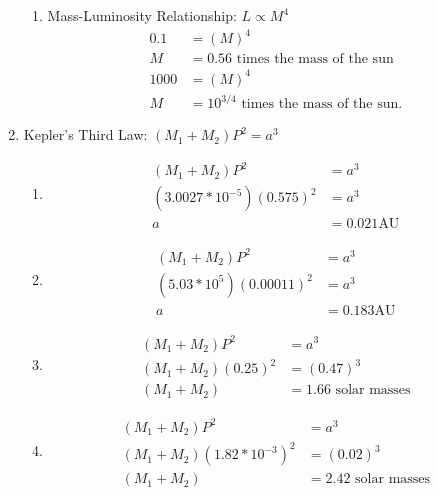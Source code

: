 \documentclass{article}
\begin{document}
\begin{enumerate}
\begin{enumerate}
        \item
        
        Mass-Luminosity Relationship: $L\propto M^4$
        \begin{align*}
            0.1 &= (M)^4\\
            M &= 0.56 \text{ times the mass of the sun}\\
            1000 &= (M)^4\\
            M &= 10^{3/4}\text{ times the mass of the sun}.
        \end{align*}
        
    \end{enumerate}
    
    \item
    
    Kepler's Third Law: $(M_1+M_2)P^2 = a^3$
    \begin{enumerate}
        \item 
        
        \begin{align*}
            (M_1+M_2)P^2 &= a^3\\
            (3.0027*10^{-5})(0.575)^2 &= a^3\\
            a &= 0.021 \text{AU}
        \end{align*}
        
        \item
        
        \begin{align*}
            (M_1+M_2)P^2 &= a^3\\
            (5.03*10^5)(0.00011)^2 &= a^3\\
            a &= 0.183 \text{AU}
        \end{align*}
        
        \item
        
        \begin{align*}
            (M_1+M_2)P^2 &= a^3\\
            (M_1+M_2)(0.25)^2 &= (0.47)^3\\
            (M_1+M_2) &= 1.66 \text{ solar masses}
        \end{align*}
        
        \item
        
        \begin{align*}
            (M_1+M_2)P^2 &= a^3\\
            (M_1+M_2)(1.82*10^{-3})^2 &= (0.02)^3\\
            (M_1+M_2) &= 2.42 \text{ solar masses}
        \end{align*}
        

\end{enumerate}
\end{enumerate}
\end{document}
